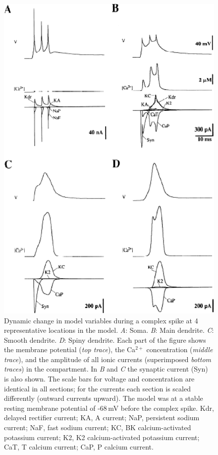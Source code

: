 \documentclass[12pt]{article}
\begin{document}
\clearpage

\begin{figure}[h]
\centering
   \includegraphics[scale=0.75]{figures/Fig.2.4.eps}
   \caption{Dynamic change in model variables during a complex spike at 4 representative locations in the model. {\it A}: Soma. {\it B}: Main dendrite. {\it C}: Smooth dendrite. {\it D}: Spiny dendrite. Each part of the figure shows the membrane potential ({\em top trace}), the Ca$^{2+}$ concentration ({\em middle trace}), and the amplitude of all ionic currents (superimposed {\em bottom traces}) in the compartment. In {\it B} and {\it C} the synaptic current (Syn) is also shown. The scale bars for voltage and concentration are identical in all sections; for the currents each section is scaled differently (outward currents upward). The model was at a stable resting membrane potential of -68\,mV before the complex spike. Kdr, delayed rectifier current; KA, A current; NaP, persistent sodium current; NaF, fast sodium current; KC, BK calcium-activated potassium current; K2, K2 calcium-activated potassium current; CaT, T calcium current; CaP, P calcium current.}
   \label{fig:DS2.4}
\end{figure}
\end{document}
